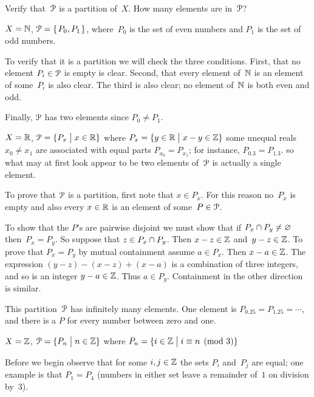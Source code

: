 \documentclass{ibl}  %
\begin{document}
\begin{problem} 
  Verify that~$\EuScript{P}$ is a partition of~$X$.  
  How many elements are in~$\EuScript{P}$?
\begin{exes}
\begin{exercise} 
  $X=\mathbb{N}$, $\EuScript{P}=\mbox{$\{\hspace{0.1em}P_0,P_1\hspace{0.1em}\}$}$, 
  where~$P_0$ is the set of even numbers
  and $P_1$ is the set of odd numbers.
\end{exercise}
\begin{answer}
  To verify that it is a partition we will check the three conditions.
  First, that no element $P_i\in \EuScript{P}$ is empty is clear.
  Second, that every element of~$\mathbb{N}$ is an element of some~$P_i$ is
  also clear.
  The third is also clear; no element of~$\mathbb{N}$ is both even and odd.

  Finally, $\EuScript{P}$ has two elements since $P_0\neq P_1$.  
\end{answer}
\begin{exercise} 
      $X=\mathbb{R}$, $\EuScript{P}=\{P_x \bigm| x\in \mathbb{R}\}$
      where $P_x=\{y\in\mathbb{R} \bigm| x-y\in \mathbb{Z}\}$
      \hspace{0.75em}\hint some unequal reals $x_0\neq x_1$ 
      are associated with equal parts $P_{x_0}=P_{x_1}$; 
      for instance, $P_{0.3}=P_{1.3}$.  
      so what may at first look appear to be two elements of~$\EuScript{P}$
      is actually a single element.
\end{exercise}
\begin{answer}
  To prove that $\EuScript{P}$ is a partition, first note that $x\in P_x$.
  For this reason no~$P_x$ is empty and also
  every $x\in\mathbb{R}$ is an element of some~$P\in\EuScript{P}$.

  To show that the $P$'s are pairwise disjoint 
  we must show that
  if $P_x\cap P_y\neq\varnothing$ then~$P_x=P_y$.
  So suppose that $z\in P_x\cap P_y$.
  Then $x-z\in\mathbb{Z}$ and~$y-z\in \mathbb{Z}$.
  To prove that $P_x=P_y$ by mutual containment assume $a\in P_x$.
  Then $x-a\in\mathbb{Z}$.
  The expression $(y-z)-(x-z)+(x-a)$ is a combination of three integers,
  and so is an integer $y-a\in\mathbb{Z}$.
  Thus $a\in P_y$.
  Containment in the other direction is similar.

  This partition~$\EuScript{P}$ has infinitely many elements.
  One element is $P_{0.25}=P_{1.25}=\cdots$, and there is a $P$ for every
  number between zero and one.  
\end{answer}
\begin{exercise} 
     $X=\mathbb{Z}$, $\EuScript{P}=\{P_n \bigm| n\in\mathbb{Z}\}$
      where $P_n=\{i\in\mathbb{Z} \bigm| i\equiv n\pmod 3\}$
\end{exercise}
\begin{answer}
  Before we begin observe that 
  for some $i,j\in\mathbb{Z}$ the sets $P_i$ and~$P_j$ are equal;
  one example is that $P_1=P_4$ (numbers in either set leave a remainder 
  of~$1$ on division by~$3$).


\end{answer}
\end{exes}
\end{problem}
\end{document}
